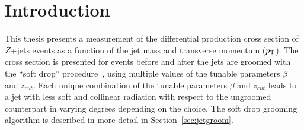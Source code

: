 
\chapter{Introduction}\label{sec:intro}




This thesis presents a measurement of the differential production cross section
of $Z$+jets events as a function of the jet mass and transverse
momentum ($p_{\mathrm{T}}$). The cross section is presented for events before
and after the jets are groomed with the ``soft drop''
procedure~\cite{softdrop}, using multiple values of the tunable parameters $\beta$ and $z_{cut}$. Each unique combination of the tunable parameters $\beta$ and $z_{cut}$ leads to a jet with less soft and collinear radiation with respect to the ungroomed counterpart in varying degrees depending on the choice. The soft drop grooming algorithm is described in more detail in Section~\ref{sec:jetgroom}.


